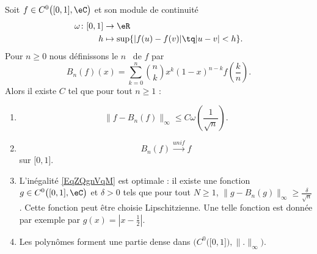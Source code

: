 \begin{theorem}    \label{ThoDJIvrty}
	Soit \( f\in C^0\big( \mathopen[ 0 , 1 \mathclose],\eC \big)\) et son module de continuité
	\begin{equation}
		\begin{aligned}
			\omega\colon \mathopen[ 0 , 1 \mathclose] & \to \eR                                        \\
			h                                         & \mapsto \sup\{ | f(u)-f(v) |\tq | u-v |< h \}.
		\end{aligned}
	\end{equation}
	Pour \( n\geq 0\) nous définissons le \( n\)\ieme\  de \( f\) par
	\begin{equation}
		B_n(f)(x)=\sum_{k=0}^{n}\binom{ n }{ k }x^k(1-x)^{n-k}f\left( \frac{ k }{ n } \right).
	\end{equation}
	Alors il existe \( C\) tel que pour tout \( n\geq 1\) :
	\begin{enumerate}
		\item
		      \begin{equation}        \label{EqZQgnVqM}
			      \| f-B_n(f) \|_{\infty}\leq C\omega\left( \frac{1}{ \sqrt{n} } \right).
		      \end{equation}
		\item
		      \begin{equation}
			      B_n(f)\stackrel{unif}{\longrightarrow}f
		      \end{equation}
		      sur \( \mathopen[ 0 , 1 \mathclose]\).
		\item
		      L'inégalité \eqref{EqZQgnVqM} est optimale : il existe une fonction \( g\in C^{0}\big( \mathopen[ 0 , 1 \mathclose],\eC \big)\) et \( \delta>0\) tels que pour tout \( N\geq 1\), \( \| g-B_n(g) \|_{\infty}\geq\frac{ \delta }{ \sqrt{n} }\). Cette fonction peut être choisie Lipschitzienne. Une telle fonction est donnée par exemple par \( g(x)=| x-\frac{ 1 }{2} |\).
		\item
		      Les polynômes forment une partie dense dans \( \Big( C^0\big( \mathopen[ 0 , 1 \mathclose] \big),\| . \|_{\infty} \Big)\).
	\end{enumerate}
\end{theorem}

